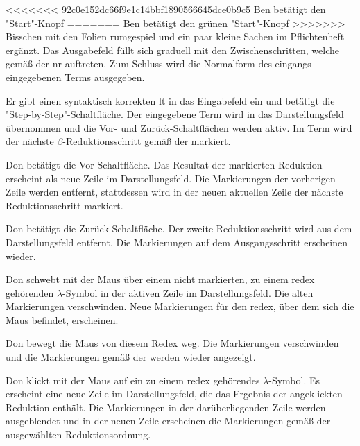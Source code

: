 \documentclass[parskip=full,11pt,twoside]{scrartcl}
\begin{document}
<<<<<<< 92c0e152dc66f9e1c14bbf1890566645dce0b9c5
{Ben betätigt den "Start"-Knopf}
=======
{Ben betätigt den grünen "Start"-Knopf}
>>>>>>> Bisschen mit den Folien rumgespiel und ein paar kleine Sachen im Pflichtenheft ergänzt.
{Das Ausgabefeld füllt sich graduell mit den Zwischenschritten, welche gemäß der \gls{nr} auftreten.
Zum Schluss wird die Normalform des eingangs eingegebenen Terms ausgegeben.}


{Er gibt einen syntaktisch korrekten \gls{lt} in das Eingabefeld ein und betätigt
die "Step-by-Step"-Schaltfläche.}
{Der eingegebene Term wird in das Darstellungsfeld übernommen und die Vor- und
Zurück-Schaltflächen werden aktiv. Im Term wird der nächste $\beta$-Reduktionsschritt
gemäß der  markiert.}

{Don betätigt die Vor-Schaltfläche.}
{Das Resultat der markierten Reduktion erscheint als neue Zeile im Darstellungsfeld.
Die Markierungen der vorherigen Zeile werden entfernt, stattdessen wird in der neuen
aktuellen Zeile der nächste Reduktionsschritt markiert.}

{Don betätigt die Zurück-Schaltfläche.}
{Der zweite Reduktionsschritt wird aus dem Darstellungsfeld entfernt. Die Markierungen
auf dem Ausgangsschritt erscheinen wieder.}

{Don schwebt mit der Maus über einem nicht markierten, zu einem \gls{redex} gehörenden
$\lambda$-Symbol in der aktiven Zeile im Darstellungsfeld.}
{Die alten Markierungen verschwinden. Neue Markierungen für den \gls{redex}, über dem
sich die Maus befindet, erscheinen.}

{Don bewegt die Maus von diesem Redex weg.}
{Die Markierungen verschwinden und die Markierungen gemäß der 
werden wieder angezeigt.}

{Don klickt mit der Maus auf ein zu einem \gls{redex} gehörendes $\lambda$-Symbol.}
{Es erscheint eine neue Zeile im Darstellungsfeld, die das Ergebnis der angeklickten
Reduktion enthält. Die Markierungen in der darüberliegenden Zeile werden ausgeblendet
und in der neuen Zeile erscheinen die Markierungen gemäß der ausgewählten
Reduktionsordnung.}
\end{document}
